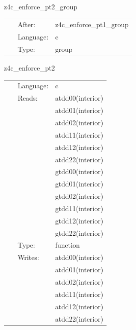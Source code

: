 \documentclass{article}
\begin{document}
\vspace{5mm}


\hspace{5mm} z4c\_enforce\_pt2\_group 

\hspace{5mm}{\it group for function `z4c\_enforce\_pt2`. generated by einsteinengine. } 


\hspace{5mm}

 \begin{tabular*}{160mm}{cll} 
~ & After:  & z4c\_enforce\_pt1\_group \\ 
~ & Language:  & c \\ 
~ & Type:  & group \\ 
\end{tabular*} 


\vspace{5mm}


\hspace{5mm} z4c\_enforce\_pt2 

\hspace{5mm}{\it function `z4c\_enforce\_pt2` generated by einsteinengine. } 


\hspace{5mm}

 \begin{tabular*}{160mm}{cll} 
~ & Language:  & c \\ 
~ & Reads:  & atdd00(interior) \\ 
~& ~ &atdd01(interior)\\ 
~& ~ &atdd02(interior)\\ 
~& ~ &atdd11(interior)\\ 
~& ~ &atdd12(interior)\\ 
~& ~ &atdd22(interior)\\ 
~& ~ &gtdd00(interior)\\ 
~& ~ &gtdd01(interior)\\ 
~& ~ &gtdd02(interior)\\ 
~& ~ &gtdd11(interior)\\ 
~& ~ &gtdd12(interior)\\ 
~& ~ &gtdd22(interior)\\ 
~ & Type:  & function \\ 
~ & Writes:  & atdd00(interior) \\ 
~& ~ &atdd01(interior)\\ 
~& ~ &atdd02(interior)\\ 
~& ~ &atdd11(interior)\\ 
~& ~ &atdd12(interior)\\ 
~& ~ &atdd22(interior)\\ 
\end{tabular*} 
\end{document}

